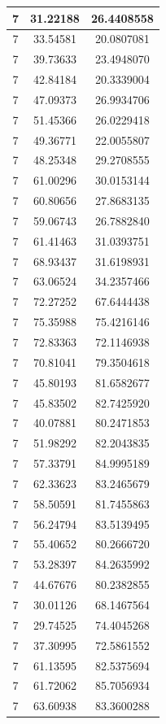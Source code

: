 \documentclass[
]{book}
\begin{document}
\begin{tabular}{c|c|c}
\hline
7 & 31.22188 & 26.4408558\\
\hline
7 & 33.54581 & 20.0807081\\
\hline
7 & 39.73633 & 23.4948070\\
\hline
7 & 42.84184 & 20.3339004\\
\hline
7 & 47.09373 & 26.9934706\\
\hline
7 & 51.45366 & 26.0229418\\
\hline
7 & 49.36771 & 22.0055807\\
\hline
7 & 48.25348 & 29.2708555\\
\hline
7 & 61.00296 & 30.0153144\\
\hline
7 & 60.80656 & 27.8683135\\
\hline
7 & 59.06743 & 26.7882840\\
\hline
7 & 61.41463 & 31.0393751\\
\hline
7 & 68.93437 & 31.6198931\\
\hline
7 & 63.06524 & 34.2357466\\
\hline
7 & 72.27252 & 67.6444438\\
\hline
7 & 75.35988 & 75.4216146\\
\hline
7 & 72.83363 & 72.1146938\\
\hline
7 & 70.81041 & 79.3504618\\
\hline
7 & 45.80193 & 81.6582677\\
\hline
7 & 45.83502 & 82.7425920\\
\hline
7 & 40.07881 & 80.2471853\\
\hline
7 & 51.98292 & 82.2043835\\
\hline
7 & 57.33791 & 84.9995189\\
\hline
7 & 62.33623 & 83.2465679\\
\hline
7 & 58.50591 & 81.7455863\\
\hline
7 & 56.24794 & 83.5139495\\
\hline
7 & 55.40652 & 80.2666720\\
\hline
7 & 53.28397 & 84.2635992\\
\hline
7 & 44.67676 & 80.2382855\\
\hline
7 & 30.01126 & 68.1467564\\
\hline
7 & 29.74525 & 74.4045268\\
\hline
7 & 37.30995 & 72.5861552\\
\hline
7 & 61.13595 & 82.5375694\\
\hline
7 & 61.72062 & 85.7056934\\
\hline
7 & 63.60938 & 83.3600288\\

\end{tabular}
\end{document}
